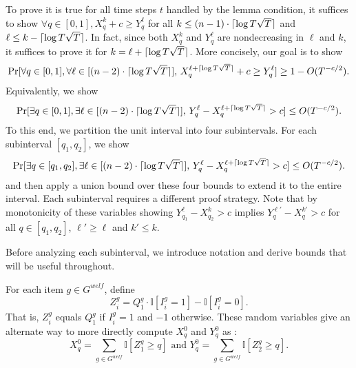To prove it is true for all time steps $t$ handled by the lemma condition, it suffices to show $\forall q \in [0, 1], X^k_q + c \ge Y^\ell_q$ for all $k \le (n - 1) \cdot \lceil\log T \sqrt{T}\rceil$ and $\ell \le k - \lceil\log T \sqrt{T}\rceil$. In fact, since both $X^k_q$ and $Y^\ell_q$ are nondecreasing in $\ell$ and $k$, it suffices to prove it for $k = \ell + \lceil\log T \sqrt{T}\rceil$. More concisely, our goal is to show
        \[
            \Pr[\forall q \in [0, 1], \forall \ell \in [(n - 2) \cdot \lceil\log T \sqrt{T}\rceil], \,  X_q^{\ell + \lceil\log T \sqrt{T}\rceil} + c \ge Y^\ell_q] \ge 1  - O(T^{-c/2}).
        \]
        Equivalently, we show
        \[
            \Pr[\exists q \in [0, 1], \exists \ell \in [(n - 2) \cdot \lceil\log T \sqrt{T}\rceil], \,  Y^\ell_q - X_q^{\ell + \lceil\log T \sqrt{T}\rceil}  > c ] \le  O(T^{-c/2}).
        \]
        To this end, we partition the unit interval into four subintervals. For each subinterval $[q_1, q_2]$, we show
        \begin{equation}\label{ineq:subinterval}
            \Pr[\exists q \in [q_1, q_2], \exists \ell \in [(n - 2) \cdot \lceil\log T \sqrt{T}\rceil], \,  Y^\ell_q - X_q^{\ell + \lceil\log T \sqrt{T}\rceil}  > c  ] \le  O(T^{-c/2}).
        \end{equation}
        and then apply a union bound over these four bounds to extend it to the entire interval. Each subinterval requires a different proof strategy. Note that by monotonicity of these variables showing $Y^\ell_{q_1} - X_{q_2}^k  > c $ implies $Y^{\ell'}_q - X_{q}^{k'}  > c $ for all $q \in [q_1, q_2]$, $\ell' \ge \ell$ and $k' \le k$.
        

        Before analyzing each subinterval, we introduce notation and derive bounds that will be useful throughout.


        For each item $g \in G^{welf}$, define
\[
    Z^g_i = Q^g_1 \cdot \mathbb{I}[I^g_i = 1] - \mathbb{I}[I^g_i = 0].
\]
That is, $Z^g_i$ equals $Q^g_1$ if $I^g_i = 1$ and $-1$ otherwise. These random variables give an alternate way to more directly compute $X^0_q$ and $Y^0_q$ as :
\[
    X^0_q = \sum_{g \in G^{welf}} \mathbb{I}[Z^g_1 \ge q] \text{ and } Y^0_q = \sum_{g \in G^{welf}} \mathbb{I}[Z^g_2 \ge q].
\]

